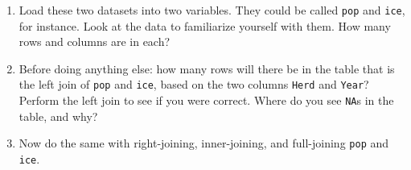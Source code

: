 \documentclass[
  letterpaper,
  DIV=11,
  numbers=noendperiod]{scrreprt}
\providecommand{\tightlist}{%
  \setlength{\itemsep}{0pt}\setlength{\parskip}{0pt}}\usepackage{longtable,booktabs,array}
\begin{document}
\begin{enumerate}
\def\labelenumi{\arabic{enumi}.}
\tightlist
\item
  Load these two datasets into two variables. They could be called
  \texttt{pop} and \texttt{ice}, for instance. Look at the data to
  familiarize yourself with them. How many rows and columns are in each?
\item
  Before doing anything else: how many rows will there be in the table
  that is the left join of \texttt{pop} and \texttt{ice}, based on the
  two columns \texttt{Herd} and \texttt{Year}? Perform the left join to
  see if you were correct. Where do you see \texttt{NA}s in the table,
  and why?
\item
  Now do the same with right-joining, inner-joining, and full-joining
  \texttt{pop} and \texttt{ice}.
\end{enumerate}
\end{document}
